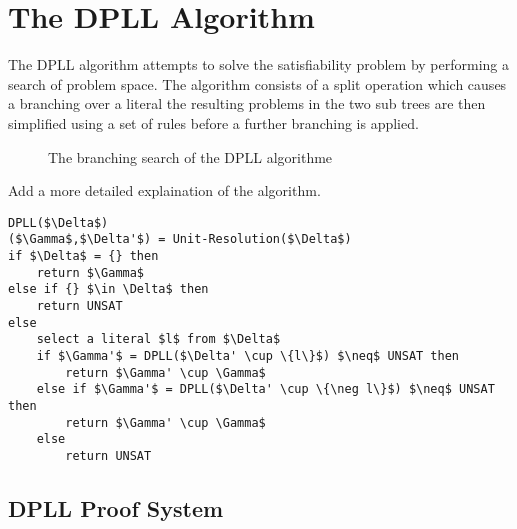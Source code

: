 \section{The DPLL Algorithm}
The DPLL algorithm attempts to solve the satisfiability problem by performing a search of problem space. The algorithm consists of a split operation which causes a branching over a literal the resulting problems in the two sub trees are then simplified using a set of rules before a further branching is applied.
\bigskip
\begin{figure}[h!]
\begin{center}
\end{center}
\caption{The branching search of the DPLL algorithme}
\end{figure}
\bigskip

Add a more detailed explaination of the algorithm.


\begin{lstlisting}[caption = Example DPLL Algorithm,mathescape]
DPLL($\Delta$)
($\Gamma$,$\Delta'$) = Unit-Resolution($\Delta$)
if $\Delta$ = {} then
	return $\Gamma$
else if {} $\in \Delta$ then
	return UNSAT
else
	select a literal $l$ from $\Delta$
	if $\Gamma'$ = DPLL($\Delta' \cup \{l\}$) $\neq$ UNSAT then
		return $\Gamma' \cup \Gamma$ 
	else if $\Gamma'$ = DPLL($\Delta' \cup \{\neg l\}$) $\neq$ UNSAT then 
		return $\Gamma' \cup \Gamma$ 
	else
		return UNSAT
\end{lstlisting}



\subsection*{DPLL Proof System}

